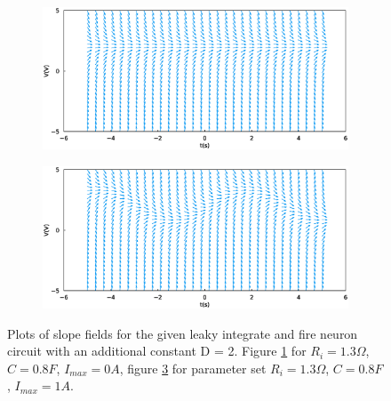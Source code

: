 \documentclass{scrartcl}			%
\begin{document}
\begin{figure}[H]	
	\centering
	\begin{subfigure}[b]{\textwidth}			%
		\includegraphics[width=1\linewidth]{imgs/slopes_circuitDGL_1_withConst.eps}
		\caption{}
		\label{fig:circ_dgl3} %
	\end{subfigure}

	\begin{subfigure}[b]{\textwidth}					%
		\includegraphics[width=1\linewidth]{imgs/slopes_circuitDGL_2_withConst.eps}
		\caption{}
		\label{fig:circ_dgl4} %
	\end{subfigure}
	\caption{Plots of slope fields for the given leaky integrate and fire neuron circuit with an additional constant D = 2. Figure \ref{fig:circ_dgl3} for $R_{i} = 1.3  \Omega$, $C = 0.8 F$, $I_{max} = 0 A$,  figure \ref{fig:circ_dgl4} for parameter set $R_{i} = 1.3  \Omega$, $C = 0.8 F$, $I_{max} = 1 A $.}
\end{figure}
\end{document}
